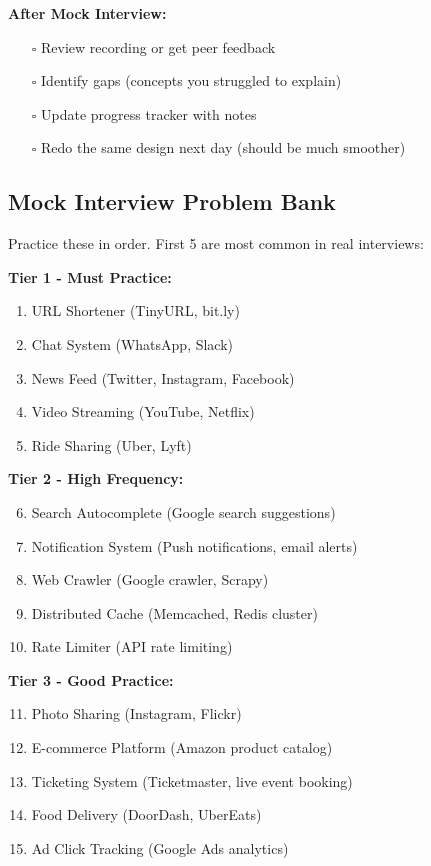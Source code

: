 \documentclass[10pt]{article}
\begin{document}
\textbf{After Mock Interview:}
\begin{itemize}
\item[$\square$] Review recording or get peer feedback
\item[$\square$] Identify gaps (concepts you struggled to explain)
\item[$\square$] Update progress tracker with notes
\item[$\square$] Redo the same design next day (should be much smoother)
\end{itemize}

\subsection{Mock Interview Problem Bank}

Practice these in order. First 5 are most common in real interviews:

\textbf{Tier 1 - Must Practice:}
\begin{enumerate}
\item URL Shortener (TinyURL, bit.ly)
\item Chat System (WhatsApp, Slack)
\item News Feed (Twitter, Instagram, Facebook)
\item Video Streaming (YouTube, Netflix)
\item Ride Sharing (Uber, Lyft)
\end{enumerate}

\textbf{Tier 2 - High Frequency:}
\begin{enumerate}
\setcounter{enumi}{5}
\item Search Autocomplete (Google search suggestions)
\item Notification System (Push notifications, email alerts)
\item Web Crawler (Google crawler, Scrapy)
\item Distributed Cache (Memcached, Redis cluster)
\item Rate Limiter (API rate limiting)
\end{enumerate}

\textbf{Tier 3 - Good Practice:}
\begin{enumerate}
\setcounter{enumi}{10}
\item Photo Sharing (Instagram, Flickr)
\item E-commerce Platform (Amazon product catalog)
\item Ticketing System (Ticketmaster, live event booking)
\item Food Delivery (DoorDash, UberEats)
\item Ad Click Tracking (Google Ads analytics)
\end{enumerate}
\end{document}
